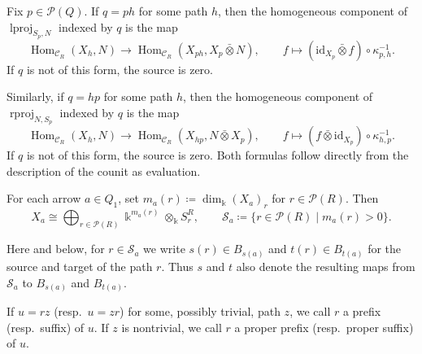 \documentclass{amsart}
\newcommand{\id}{\mathrm{id}}
\DeclareMathOperator{\lproj}{lproj}
\DeclareMathOperator{\rproj}{rproj}
\newcommand{\btensor}{\mathbin{\bar{\otimes}}}
\theoremstyle{definition}
\theoremstyle{remark}
\numberwithin{equation}{section}
\begin{document}
Fix $p\in\mathcal P(Q)$.
If $q=ph$ for some path $h$, then the homogeneous component of
$\lproj_{S_p,N}$ indexed by $q$ is the map
\begin{equation}\label{xxeq5-2}
\operatorname{Hom}_{\mathcal C_R}(X_h,N)
\longrightarrow
\operatorname{Hom}_{\mathcal C_R}(X_{ph},X_p\btensor N),
\qquad
f\longmapsto
(\id_{X_p}\btensor f)
\circ
\kappa_{p,h}^{-1}.
\end{equation}
If $q$ is not of this form, the source is zero.

Similarly, if $q=hp$ for some path $h$, then the homogeneous component of
$\rproj_{N,S_p}$ indexed by $q$ is the map
\begin{equation}\label{xxeq5-3}
\operatorname{Hom}_{\mathcal C_R}(X_h,N)
\longrightarrow
\operatorname{Hom}_{\mathcal C_R}(X_{hp},N\btensor X_p),
\qquad
f\longmapsto
(f\btensor\id_{X_p})
\circ
\kappa_{h,p}^{-1}.
\end{equation}
If $q$ is not of this form, the source is zero.
Both formulas follow directly from the description of the counit as
evaluation.

For each arrow $a\in Q_1$, set
$m_a(r)\coloneqq\dim_{\Bbbk}(X_a)_r$ for $r\in\mathcal P(R)$. Then
\[
X_a
\cong
\bigoplus_{r\in\mathcal P(R)}
\Bbbk^{m_a(r)}
\otimes_{\Bbbk}
S_r^R,
\qquad
\mathcal S_a
\coloneqq
\{
r\in\mathcal P(R)
\mid
m_a(r)>0
\}.
\]

Here and below, for $r\in\mathcal S_a$ we write
$s(r)\in B_{s(a)}$ and $t(r)\in B_{t(a)}$ for the source and target of the
path $r$. Thus $s$ and $t$ also denote the resulting maps from
$\mathcal S_a$ to $B_{s(a)}$ and $B_{t(a)}$.

If $u=rz$ (resp.\ $u=zr$) for some, possibly trivial, path $z$, we call
$r$ a prefix (resp.\ suffix) of $u$. If $z$ is nontrivial, we call $r$ a
proper prefix (resp.\ proper suffix) of $u$.
\end{document}
